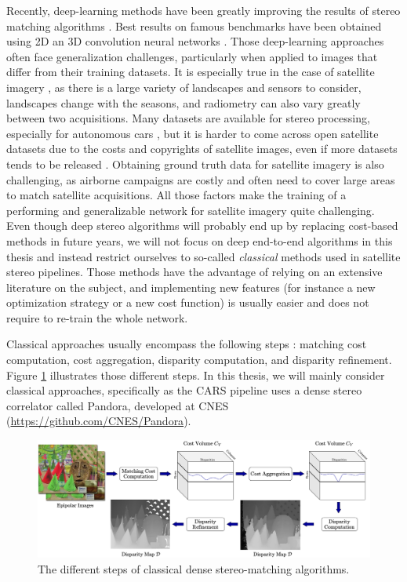 Recently, deep-learning methods have been greatly improving the results of stereo matching algorithms \cite{tosi_survey_2024}. Best results on famous benchmarks have been obtained using 2D an 3D convolution neural networks \cite{guo_openstereo_2024, liu_playing_2024}. Those deep-learning approaches often face generalization challenges, particularly when applied to images that differ from their training datasets. It is especially true in the case of satellite imagery \cite{mari_disparity_2022, jiang_rethinking_2024}, as there is a large variety of landscapes and sensors to consider, landscapes change with the seasons, and radiometry can also vary greatly between two acquisitions. Many datasets are available for stereo processing, especially for autonomous cars \cite{geiger_are_2012, geiger_vision_2013}, but it is harder to come across open satellite datasets due to the costs and copyrights of satellite images, even if more datasets tends to be released \cite{bosch_semantic_2018, le_saux_data_2019, huang_urban_2022}. Obtaining ground truth data for satellite imagery is also challenging, as airborne campaigns are costly and often need to cover large areas to match satellite acquisitions. All those factors make the training of a performing and generalizable network for satellite imagery quite challenging. Even though deep stereo algorithms will probably end up by replacing cost-based methods in future years, we will not focus on deep end-to-end algorithms in this thesis and instead restrict ourselves to so-called \textit{classical} methods used in satellite stereo pipelines. Those methods have the advantage of relying on an extensive literature on the subject, and implementing new features (for instance a new optimization strategy or a new cost function) is usually easier and does not require to re-train the whole network.

Classical approaches usually encompass the following steps \cite{scharstein_taxonomy_2001}: matching cost computation, cost aggregation, disparity computation, and disparity refinement. Figure \ref{fig:stereo_matching_pipeline} illustrates those different steps. In this thesis, we will mainly consider classical approaches, specifically as the CARS pipeline uses a dense stereo correlator called Pandora, developed at CNES (\url{https://github.com/CNES/Pandora}).

\begin{figure}
	\centering
	\includegraphics[width=\linewidth]{Images/Chap_1/stereo-matching_pipeline.png}
	\caption{The different steps of classical dense stereo-matching algorithms.}
	\label{fig:stereo_matching_pipeline}
\end{figure}

